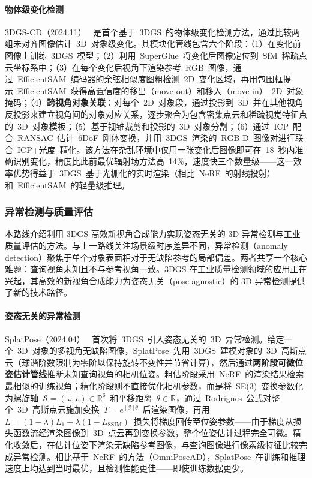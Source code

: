 \paragraph{物体级变化检测}

3DGS-CD（2024.11）~\cite{2411_03706} 是首个基于~3DGS~的物体级变化检测方法，通过比较两组未对齐图像估计~3D~对象级变化。其模块化管线包含六个阶段：（1）在变化前图像上训练~3DGS~模型；（2）利用~SuperGlue~将变化后图像定位到~SfM~稀疏点云坐标系中；（3）在每个变化后视角下渲染参考~RGB~图像，通过~EfficientSAM~编码器的余弦相似度图粗检测~2D~变化区域，再用包围框提示~EfficientSAM~获得高置信度的移出（move-out）和移入（move-in）~2D~对象掩码；（4）\textbf{跨视角对象关联}：对每个~2D~对象段，通过投影到~3D~并在其他视角反投影来建立视角间的对象对应关系，逐步聚合为包含密集点云和稀疏视觉特征点的~3D~对象模板；（5）基于视锥裁剪和投影的~3D~对象分割；（6）通过~ICP~配合~RANSAC~估计~6DoF~刚体变换，并用~3DGS~渲染的~RGB-D~图像对进行联合~ICP+光度~精化。该方法在杂乱环境中仅用一张变化后图像即可在~18~秒内准确识别变化，精度比此前最优辐射场方法高~14\%，速度快三个数量级——这一效率优势得益于~3DGS~基于光栅化的实时渲染（相比~NeRF~的射线投射）和~EfficientSAM~的轻量级推理。

\subsubsection{异常检测与质量评估}

本路线介绍利用 3DGS 高效新视角合成能力实现姿态无关的 3D 异常检测与工业质量评估的方法。与上一路线关注场景级时序差异不同，异常检测（anomaly detection）聚焦于单个对象表面相对于无缺陷参考的局部偏差。两者共享一个核心难题：查询视角未知且不与参考视角一致。3DGS 在工业质量检测领域的应用正在兴起，其高效的新视角合成能力为姿态无关（pose-agnostic）的 3D 异常检测提供了新的技术路径。

\paragraph{姿态无关的异常检测}

SplatPose（2024.04）~\cite{2404_06832} 首次将~3DGS~引入姿态无关的~3D~异常检测。给定一个~3D~对象的多视角无缺陷图像，SplatPose~先用~3DGS~建模对象的~3D~高斯点云（球谐阶数限制为零阶以保持旋转不变性并节省计算），然后通过\textbf{两阶段可微位姿估计管线}推断未知查询视角的相机位姿。粗估阶段采用~NeRF~的渲染结果检索最相似的训练视角；精化阶段则不直接优化相机参数，而是将~SE(3)~变换参数化为螺旋轴~$\mathcal{S} = (\omega, v) \in \mathbb{R}^6$~和平移距离~$\theta \in \mathbb{R}$，通过~Rodrigues~公式对整个~3D~高斯点云施加变换~$T = e^{[\mathcal{S}]\theta}$~后渲染图像，再用~$L = (1-\lambda)L_1 + \lambda(1-L_\text{SSIM})$~损失将梯度回传至位姿参数——由于梯度从损失函数流经渲染图像到~3D~点云再到变换参数，整个位姿估计过程完全可微。精化收敛后，在估计位姿下渲染无缺陷参考图像，与查询图像进行像素级特征比较完成异常检测。相比基于~NeRF~的方法（OmniPoseAD），SplatPose~在训练和推理速度上均达到当时最优，且检测性能更佳——即使训练数据更少。


